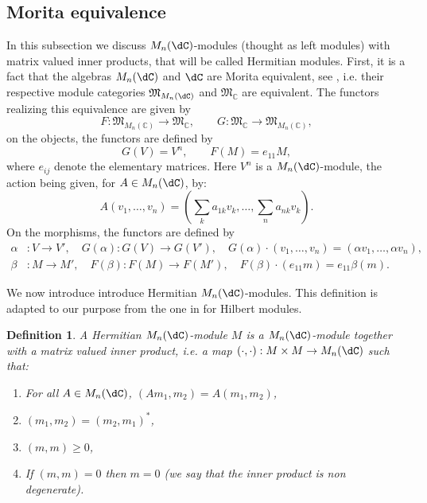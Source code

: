 \documentclass[a4paper,reqno]{amsart}
\newtheorem{definition}[theorem]{Definition}
\theoremstyle{definition}
\numberwithin{equation}{section}
\begin{document}
\subsection{Morita equivalence}
In this subsection we discuss $M_n(\dC)$-modules (thought as left modules) with matrix valued inner products, that will be called Hermitian modules. First, it is a fact  that the algebras $M_n(\dC)$ and $\dC$ are Morita equivalent, see \cite{Lam99}, i.e. their respective module categories $\mathfrak{M}_{M_n(\dC)}$ and $\mathfrak{M}_{\mathbb{C}}$  are equivalent. The functors realizing this equivalence are given by 
\begin{equation}
F: \mathfrak{M}_{M_n(\mathbb{C})}\to \mathfrak{M}_{\mathbb{C}}, \qquad G: \mathfrak{M}_{\mathbb{C}}\to \mathfrak{M}_{M_n(\mathbb{C})},    
\end{equation}
on the objects, the functors are defined by 
\begin{equation}
    G(V)=V^n, \qquad F(M)=e_{11}M ,
\end{equation}
where $e_{ij}$ denote the elementary matrices. Here $V^n$ is a $M_n(\dC)$-module, the action being given, for $A\in M_n(\dC)$, by:
\begin{equation}\label{eq:MnActionOnVn}
A (v_1,\ldots, v_n) =  \left(\sum_k a_{1k}v_k, \ldots, \sum_n a_{nk}v_k \right). 
\end{equation}
On the morphisms, the functors are defined by 
 \begin{align}
 \alpha&:V\to V', \quad G(\alpha): G(V)\to G(V'),\quad G(\alpha)\cdot(v_1,\ldots,v_n)=(\alpha v_1, \ldots, \alpha v_n),\\
\beta&:M\to M', \quad F(\beta): F(M)\to F(M'),\quad F(\beta)\cdot(e_{11} m)= e_{11}\beta(m).
 \end{align}


We now introduce introduce Hermitian $M_n(\dC)$-modules. This definition is adapted to our purpose from the one in \cite[Dfn II.7.1.1]{Blackadar} for Hilbert modules.  
\begin{definition}
A Hermitian $M_n(\dC)$-module $M$ is a $M_n(\dC)$-module together with a matrix valued inner product, i.e. a map $(\cdot,\cdot): M\times M\to M_n(\dC)$ such that:
\begin{enumerate}
    \item For all $A\in M_n(\dC)$, $ (A m_1,m_2)=A(m_1,m_2)$,
    \item $(m_1,m_2)=(m_2,m_1)^*$,
    \item $(m,m)\geq 0$,
    \item If $(m,m)=0$ then $ m=0$ (we say that the inner product is non degenerate).
\end{enumerate} 
\end{definition}
\end{document}
